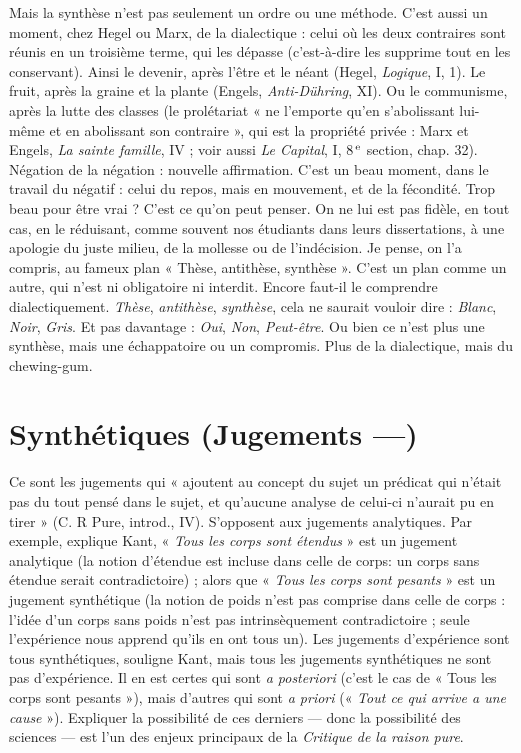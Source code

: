 Mais la synthèse n’est pas seulement un ordre ou une méthode. C’est
aussi un moment, chez Hegel ou Marx, de la dialectique : celui où les deux
contraires sont réunis en un troisième terme, qui les dépasse (c’est-à-dire les
supprime tout en les conservant). Ainsi le devenir, après l’être et le néant
(Hegel, {\it Logique}, I, 1). Le fruit, après la graine et la plante (Engels,
{\it Anti-Dühring}, XI). Ou le communisme, après la lutte des classes (le prolétariat « ne
l'emporte qu’en s’abolissant lui-même et en abolissant son contraire », qui est
la propriété privée : Marx et Engels, {\it La sainte famille}, IV ; voir aussi {\it Le Capital},
I, 8$^\text{\,e}$ section, chap. 32). Négation de la négation : nouvelle affirmation. C’est
un beau moment, dans le travail du négatif : celui du repos, mais en mouvement,
et de la fécondité. Trop beau pour être vrai ? C’est ce qu’on peut penser.
On ne lui est pas fidèle, en tout cas, en le réduisant, comme souvent nos étudiants
dans leurs dissertations, à une apologie du juste milieu, de la mollesse ou
de l’indécision. Je pense, on l’a compris, au fameux plan « Thèse, antithèse,
synthèse ». C’est un plan comme un autre, qui n’est ni obligatoire ni interdit.
Encore faut-il le comprendre dialectiquement. {\it Thèse}, {\it antithèse}, {\it synthèse}, cela ne
saurait vouloir dire : {\it Blanc}, {\it Noir}, {\it Gris}. Et pas davantage : {\it Oui}, {\it Non}, {\it Peut-être}.
Ou bien ce n’est plus une synthèse, mais une échappatoire ou un compromis.
Plus de la dialectique, mais du chewing-gum.

\section{Synthétiques (Jugements —)}
Ce sont les jugements qui « ajoutent
au concept du sujet un prédicat qui
n'était pas du tout pensé dans le sujet, et qu'aucune analyse de celui-ci n'aurait
pu en tirer » (C. R Pure, introd., IV). S’opposent aux jugements analytiques.
Par exemple, explique Kant, « {\it Tous les corps sont étendus} » est un jugement analytique
(la notion d’étendue est incluse dans celle de corps: un corps sans
étendue serait contradictoire) ; alors que « {\it Tous les corps sont pesants} » est un
jugement synthétique (la notion de poids n’est pas comprise dans celle de
corps : l’idée d’un corps sans poids n’est pas intrinsèquement contradictoire ;
seule l’expérience nous apprend qu’ils en ont tous un). Les jugements d’expérience
sont tous synthétiques, souligne Kant, mais tous les jugements synthétiques
ne sont pas d'expérience. Il en est certes qui sont {\it a posteriori} (c’est le cas
de « Tous les corps sont pesants »), mais d’autres qui sont {\it a priori} (« {\it Tout ce qui
arrive a une cause} »). Expliquer la possibilité de ces derniers — donc la possibilité
des sciences — est l’un des enjeux principaux de la {\it Critique de la raison pure}.

